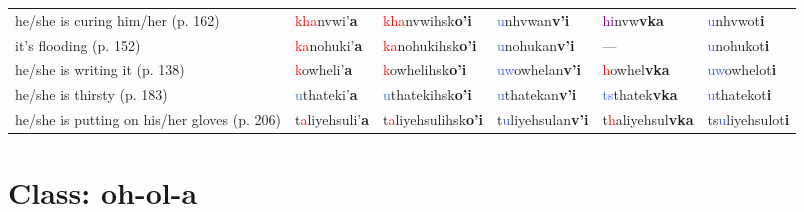 \documentclass[oneside,openany]{book}%
\begin{document}
\begin{tabularx}{\textwidth}{>{\hsize=1.5\hsize\RaggedRight}X >{\hsize=0.9\hsize}X >{\hsize=0.9\hsize}X >{\hsize=0.9\hsize}X >{\hsize=0.9\hsize}X >{\hsize=0.9\hsize}X}
he/she is curing him/her (p. 162)&\textcolor{Red}{kha}nvwi'\textbf{a}&\textcolor{Red}{kha}nvwihsk\textbf{o'i}&\textcolor{RoyalBlue}{u}nhvwan\textbf{v'i}&\textcolor{Purple}{hi}nvw\textbf{vka}&\textcolor{RoyalBlue}{u}nhvwot\textbf{i}\\%
it's flooding (p. 152)&\textcolor{Red}{ka}nohuki'\textbf{a}&\textcolor{Red}{ka}nohukihsk\textbf{o'i}&\textcolor{RoyalBlue}{u}nohukan\textbf{v'i}&---&\textcolor{RoyalBlue}{u}nohukot\textbf{i}\\%
he/she is writing it (p. 138)&\textcolor{Red}{k}owheli'\textbf{a}&\textcolor{Red}{k}owhelihsk\textbf{o'i}&\textcolor{RoyalBlue}{uw}owhelan\textbf{v'i}&\textcolor{Red}{h}owhel\textbf{vka}&\textcolor{RoyalBlue}{uw}owhelot\textbf{i}\\%
he/she is thirsty (p. 183)&\textcolor{RoyalBlue}{u}thateki'\textbf{a}&\textcolor{RoyalBlue}{u}thatekihsk\textbf{o'i}&\textcolor{RoyalBlue}{u}thatekan\textbf{v'i}&\textcolor{RoyalBlue}{ts}thatek\textbf{vka}&\textcolor{RoyalBlue}{u}thatekot\textbf{i}\\%
he/she is putting on his/her gloves (p. 206)&t\textcolor{Red}{a}liyehsuli'\textbf{a}&t\textcolor{Red}{a}liyehsulihsk\textbf{o'i}&t\textcolor{RoyalBlue}{u}liyehsulan\textbf{v'i}&t\textcolor{Red}{h}aliyehsul\textbf{vka}&ts\textcolor{RoyalBlue}{u}liyehsulot\textbf{i}\\%
\bottomrule%
\end{tabularx}%
\vspace{1em}%
\needspace{3in}%
\section*{Class: oh-ol-a}%
%
\needspace{1in}%
\end{document}
